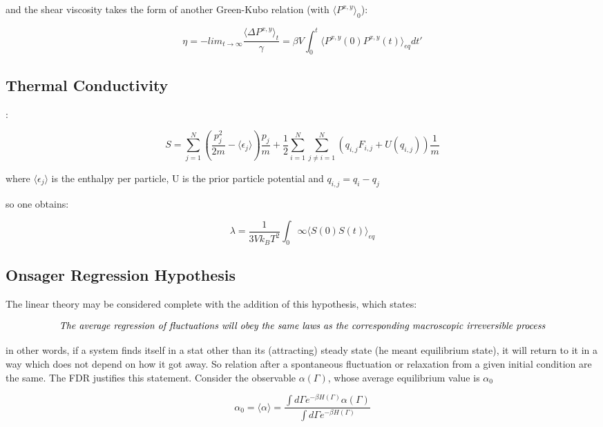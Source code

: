 \documentclass{article}
\begin{document}
and the shear viscosity takes the form of another Green-Kubo relation (with $\langle P^{x,y} \rangle_0 $):

\begin{equation}
\eta = - lim_{t \to \infty} \frac{\langle \Delta P^{x,y} \rangle_t}{\gamma} = \beta V \int_{0}^{t} \langle P^{x,y}(0) P^{x,y}(t) \rangle_{eq} dt'
\end{equation}

\subsection{Thermal Conductivity}:

\begin{equation}
S =  \sum_{j=1}^{N} ( \frac{p^2_j}{2m} - \langle \epsilon_j \rangle ) \frac{p_j}{m} + \frac{1}{2}  \sum_{i=1}^{N}  \sum_{j \neq i = 1}^{N} (q_{i,j}F_{i,j} + U(q_{i,j}) ) \frac{1}{m}
\end{equation}

where $\langle \epsilon_j \rangle$ is the enthalpy per particle, U is the prior particle potential and $q_{i,j} = q_i - q_j$

so one obtains:

\begin{equation}
\lambda = \frac{1}{3 V k_B T^2} \int_{0}{\infty} \langle S(0) S(t) \rangle_{eq}
\end{equation} \newline

\subsection{Onsager Regression Hypothesis}

The linear theory may be considered complete with the addition of this hypothesis, which states:

$$ \emph{The average regression of fluctuations will obey the same laws as the corresponding macroscopic irreversible process} $$

in other words, if a system finds itself in a stat other than its (attracting) steady state (he meant equilibrium state), it will return to it in a way which does not depend on how it got away. So relation after a spontaneous fluctuation or relaxation from a given initial condition are the same. The FDR justifies this statement.
Consider the observable $\alpha(\Gamma)$, whose average equilibrium value is $\alpha_0$

$$ \alpha_0 = \langle \alpha \rangle = \frac{\int d \Gamma e^{- \beta H(\Gamma) } \alpha(\Gamma) }{\int d \Gamma e^{- \beta H(\Gamma) } } $$
\end{document}
